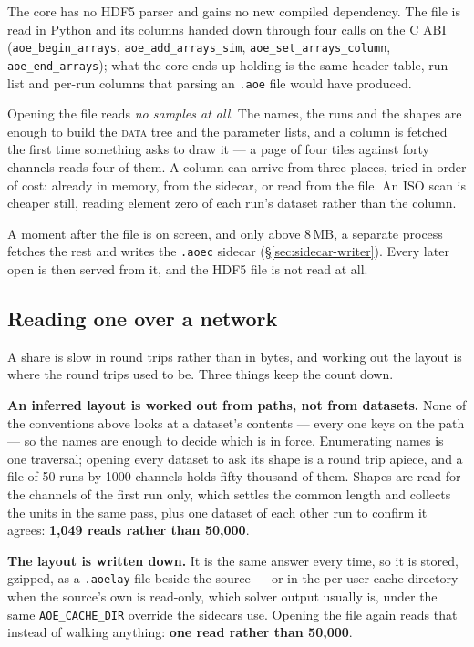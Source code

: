 \documentclass[11pt,a4paper,oneside]{report}
\newcommand{\code}[1]{\texttt{#1}}
\newcommand{\tab}[1]{\textsc{#1}}
\begin{document}
The core has no HDF5 parser and gains no new compiled dependency. The file is
read in Python and its columns handed down through four calls on the C ABI
(\code{aoe\_begin\_arrays}, \code{aoe\_add\_arrays\_sim},
\code{aoe\_set\_arrays\_column}, \code{aoe\_end\_arrays}); what the core ends up
holding is the same header table, run list and per-run columns that parsing an
\code{.aoe} file would have produced.

Opening the file reads \emph{no samples at all}. The names, the runs and the
shapes are enough to build the \tab{data} tree and the parameter lists, and a
column is fetched the first time something asks to draw it --- a page of four
tiles against forty channels reads four of them. A column can arrive from three
places, tried in order of cost: already in memory, from the sidecar, or read
from the file. An ISO scan is cheaper still, reading element zero of each run's
dataset rather than the column.

A moment after the file is on screen, and only above 8\,MB, a separate process
fetches the rest and writes the \code{.aoec} sidecar
(\S\ref{sec:sidecar-writer}). Every later open is then served from it, and the
HDF5 file is not read at all.

\subsection*{Reading one over a network}

A share is slow in round trips rather than in bytes, and working out the layout
is where the round trips used to be. Three things keep the count down.

\textbf{An inferred layout is worked out from paths, not from datasets.} None
of the conventions above looks at a dataset's contents --- every one keys on the path
--- so the names are enough to decide which is in force. Enumerating names is
one traversal; opening every dataset to ask its shape is a round trip apiece,
and a file of 50 runs by 1000 channels holds fifty thousand of them. Shapes are
read for the channels of the first run only, which settles the common length
and collects the units in the same pass, plus one dataset of each other run to
confirm it agrees: \textbf{1,049 reads rather than 50,000}.

\textbf{The layout is written down.} It is the same answer every time, so it is
stored, gzipped, as a \code{.aoelay} file beside the source --- or in the
per-user cache directory when the source's own is read-only, which solver
output usually is, under the same \code{AOE\_CACHE\_DIR} override the sidecars
use. Opening the file again reads that instead of walking anything:
\textbf{one read rather than 50,000}.
\end{document}
